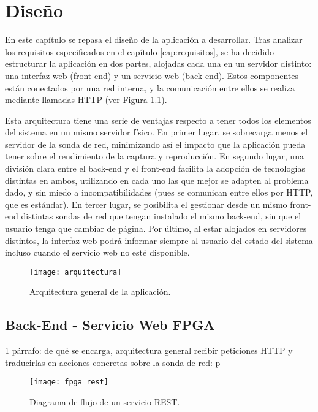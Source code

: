 \chapter{Diseño\label{cap:disenho}}

En este capítulo se repasa el diseño de la aplicación a desarrollar.
Tras analizar los requisitos especificados en el capítulo \ref{cap:requisitos}, se ha decidido estructurar la aplicación en dos partes, alojadas cada una en un servidor distinto: una interfaz web (\gls{front-end}) y un servicio web (\gls{back-end}).
Estos componentes están conectados por una red interna, y la comunicación entre ellos se realiza mediante llamadas  \gls{HTTP} (ver Figura \ref{fig:arquitectura}).

Esta arquitectura tiene una serie de ventajas respecto a tener todos los elementos del sistema en un mismo servidor físico.
En primer lugar, se sobrecarga menos el servidor de la sonda de red, minimizando así el impacto que la aplicación pueda tener sobre el rendimiento de la captura y reproducción.
En segundo lugar, una división clara entre el \gls{back-end} y el \gls{front-end} facilita la adopción de tecnologías distintas en ambos, utilizando en cada uno las que mejor se adapten al problema dado, y sin miedo a incompatibilidades (pues se comunican entre ellos por \gls{HTTP}, que es estándar).
En tercer lugar, se posibilita el gestionar desde un mismo \gls{front-end} distintas sondas de red que tengan instalado el mismo \gls{back-end}, sin que el usuario tenga que cambiar de página.
Por último, al estar alojados en servidores distintos, la interfaz web podrá informar siempre al usuario del estado del sistema incluso cuando el servicio web no esté disponible.

\begin{figure}[!htp]
  \centering
  \texttt{[image: arquitectura]}
  \caption{Arquitectura general de la aplicación.}
  \label{fig:arquitectura}
\end{figure}


\section{Back-End - Servicio Web FPGA\label{sec:dis:servicio_web_fpga}}

1 párrafo: de qué se encarga, arquitectura general
recibir peticiones \gls{HTTP} y traducirlas en acciones concretas sobre la sonda de red: p

\begin{figure}[!htp]
  \centering
  \texttt{[image: fpga\_rest]}
  \caption{Diagrama de flujo de un servicio \gls{REST}.}
  \label{fig:fpga_rest}
\end{figure}

